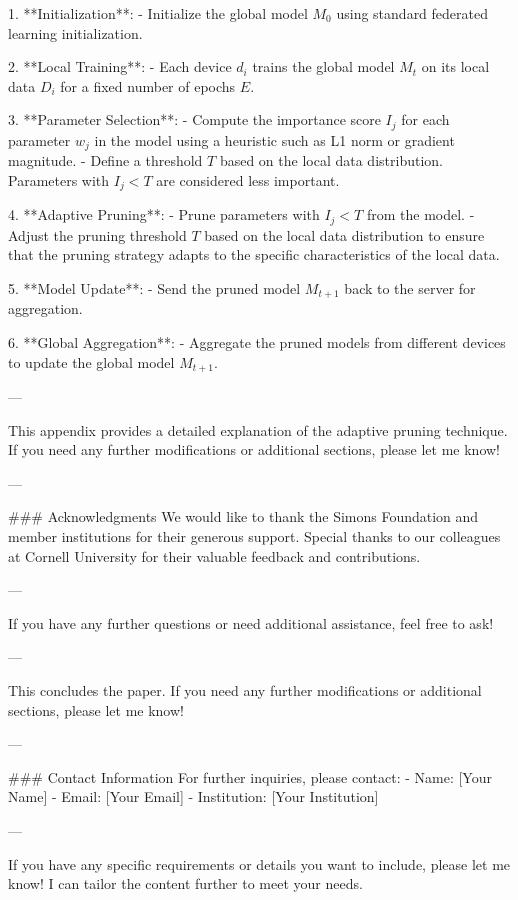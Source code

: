 1. **Initialization**:
   - Initialize the global model \( M_0 \) using standard federated learning initialization.

2. **Local Training**:
   - Each device \( d_i \) trains the global model \( M_t \) on its local data \( D_i \) for a fixed number of epochs \( E \).

3. **Parameter Selection**:
   - Compute the importance score \( I_j \) for each parameter \( w_j \) in the model using a heuristic such as L1 norm or gradient magnitude.
   - Define a threshold \( T \) based on the local data distribution. Parameters with \( I_j < T \) are considered less important.

4. **Adaptive Pruning**:
   - Prune parameters with \( I_j < T \) from the model.
   - Adjust the pruning threshold \( T \) based on the local data distribution to ensure that the pruning strategy adapts to the specific characteristics of the local data.

5. **Model Update**:
   - Send the pruned model \( M_{t+1} \) back to the server for aggregation.

6. **Global Aggregation**:
   - Aggregate the pruned models from different devices to update the global model \( M_{t+1} \).

---

This appendix provides a detailed explanation of the adaptive pruning technique. If you need any further modifications or additional sections, please let me know! 

--- 

\newpage

### Acknowledgments
We would like to thank the Simons Foundation and member institutions for their generous support. Special thanks to our colleagues at Cornell University for their valuable feedback and contributions.

---

If you have any further questions or need additional assistance, feel free to ask! 

---

This concludes the paper. If you need any further modifications or additional sections, please let me know! 

--- 

\newpage

### Contact Information
For further inquiries, please contact:
- Name: [Your Name]
- Email: [Your Email]
- Institution: [Your Institution]

---

If you have any specific requirements or details you want to include, please let me know! I can tailor the content further to meet your needs. 

